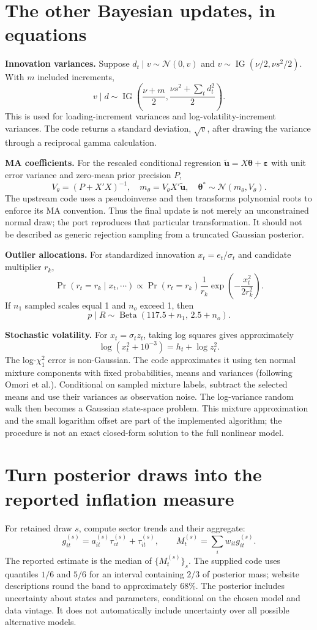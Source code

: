 \documentclass[11pt,a4paper]{article}
\newcommand{\N}{\mathcal N}
\newcommand{\IG}{\operatorname{IG}}
\begin{document}
\newpage
\section{The other Bayesian updates, in equations}
\textbf{Innovation variances.} Suppose $d_t\mid v\sim\N(0,v)$ and $v\sim\IG(\nu/2,\nu s^2/2)$. With $m$ included increments,
\[
v\mid d\sim\IG\left(\frac{\nu+m}{2},\frac{\nu s^2+\sum_t d_t^2}{2}\right).
\]
This is used for loading-increment variances and log-volatility-increment variances. The code returns a standard deviation, $\sqrt v$, after drawing the variance through a reciprocal gamma calculation.

\textbf{MA coefficients.} For the rescaled conditional regression $\widetilde{\mathbf u}=X\boldsymbol\theta+\boldsymbol\varepsilon$ with unit error variance and zero-mean prior precision $P$,
\[
V_\theta=(P+X'X)^{-1},\quad m_\theta=V_\theta X'\widetilde{\mathbf u},\quad
\boldsymbol\theta^*\sim\N(m_\theta,V_\theta).
\]
The upstream code uses a pseudoinverse and then transforms polynomial roots to enforce its MA convention. Thus the final update is not merely an unconstrained normal draw; the port reproduces that particular transformation. It should not be described as generic rejection sampling from a truncated Gaussian posterior.

\textbf{Outlier allocations.} For standardized innovation $x_t=e_t/\sigma_t$ and candidate multiplier $r_k$,
\[
\Pr(r_t=r_k\mid x_t,\cdots)\propto
\Pr(r_t=r_k)\frac{1}{r_k}\exp\left(-\frac{x_t^2}{2r_k^2}\right).
\]
If $n_1$ sampled scales equal 1 and $n_o$ exceed 1, then
\[p\mid R\sim\operatorname{Beta}(117.5+n_1,\,2.5+n_o).\]

\textbf{Stochastic volatility.} For $x_t=\sigma_t z_t$, taking log squares gives approximately
\[
\log(x_t^2+10^{-3})=h_t+\log z_t^2.
\]
The log-$\chi^2_1$ error is non-Gaussian. The code approximates it using ten normal mixture components with fixed probabilities, means and variances (following Omori et al.). Conditional on sampled mixture labels, subtract the selected means and use their variances as observation noise. The log-variance random walk then becomes a Gaussian state-space problem. This mixture approximation and the small logarithm offset are part of the implemented algorithm; the procedure is not an exact closed-form solution to the full nonlinear model.

\newpage
\section{Turn posterior draws into the reported inflation measure}
For retained draw $s$, compute sector trends and their aggregate:
\[
g_{it}^{(s)}=a_{it}^{(s)}\tau_{ct}^{(s)}+\tau_{it}^{(s)},\qquad
M_t^{(s)}=\sum_i w_{it}g_{it}^{(s)}.
\]
The reported estimate is the median of $\{M_t^{(s)}\}_s$. The supplied code uses quantiles $1/6$ and $5/6$ for an interval containing $2/3$ of posterior mass; website descriptions round the band to approximately 68\%. The posterior includes uncertainty about states and parameters, conditional on the chosen model and data vintage. It does not automatically include uncertainty over all possible alternative models.
\end{document}
